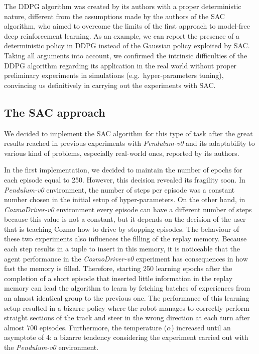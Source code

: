 The DDPG algorithm was created by its authors with a proper deterministic nature, different from the assumptions made by the authors of the SAC algorithm, who aimed to overcome the limits of the first approach to model-free deep reinforcement learning. As an example, we can report the presence of a deterministic policy in DDPG instead of the Gaussian policy exploited by SAC.
Taking all arguments into account, we confirmed the intrinsic difficulties of the DDPG algorithm regarding its application in the real world without proper preliminary experiments in simulations (e.g.\ hyper-parameters tuning), convincing us definitively in carrying out the experiments with SAC.

\subsection{The SAC approach}

We decided to implement the SAC algorithm for this type of task after the great results reached in previous experiments with \textit{Pendulum-v0} and its adaptability to various kind of problems, especially real-world ones, reported by its authors.

In the first implementation, we decided to maintain the number of epochs for each episode equal to 250.
However, this decision revealed its fragility soon.
In \textit{Pendulum-v0} environment, the number of steps per episode was a constant number chosen in the initial setup of hyper-parameters.
On the other hand, in \textit{CozmoDriver-v0} environment every episode can have a different number of steps because this value is not a constant, but it depends on the decision of the user that is teaching Cozmo how to drive by stopping episodes.
The behaviour of these two experiments also influences the filling of the replay memory.
Because each step results in a tuple to insert in this memory, it is noticeable that the agent performance in the \textit{CozmoDriver-v0} experiment has consequences in how fast the memory is filled.
Therefore, starting 250 learning epochs after the completion of a short episode that inserted little information in the replay memory can lead the algorithm to learn by fetching batches of experiences from an almost identical group to the previous one.
The performance of this learning setup resulted in a bizarre policy where the robot manages to correctly perform straight sections of the track and steer in the wrong direction at each turn after almost 700 episodes.
Furthermore, the temperature ($\alpha$) increased until an asymptote of 4: a bizarre tendency considering the experiment carried out with the \textit{Pendulum-v0} environment.

